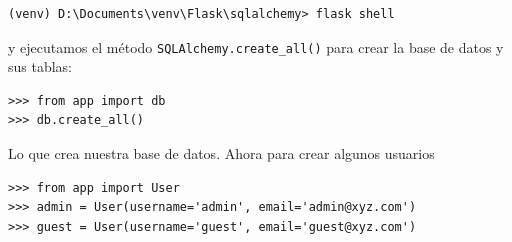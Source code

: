 \documentclass[10pt,letterpaper,notumble]{leaflet}
\begin{document}
    {\footnotesize
    \begin{verbatim}
(venv) D:\Documents\venv\Flask\sqlalchemy> flask shell
    \end{verbatim}}
    
    \vspace*{-0.4cm}
    
    y ejecutamos el método \texttt{SQLAlchemy.create\_all()} para crear la base de datos y sus tablas:
    
    \vspace*{-0.4cm}
    
    {\footnotesize
    \begin{verbatim}
>>> from app import db
>>> db.create_all()
    \end{verbatim}}

    \vspace*{-0.4cm}
    
    Lo que crea nuestra base de datos. Ahora para crear algunos usuarios
    
    \vspace*{-0.3cm}
    
    {\footnotesize
    \begin{verbatim}
>>> from app import User
>>> admin = User(username='admin', email='admin@xyz.com')
>>> guest = User(username='guest', email='guest@xyz.com')
    \end{verbatim}}
\end{document}
